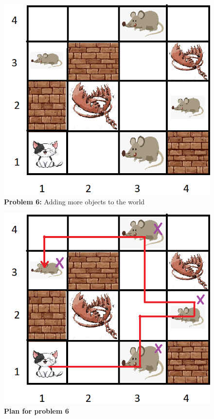 \begin{multicols}{2}

\begin{figure}[H]
    \centering
    \includegraphics[width=\linewidth]{fig/A3/cat_06.png}
    \caption{\textbf{Problem 6:} Adding more objects to the world}
    \label{fig:cat_06}
\end{figure}

\columnbreak

\begin{figure}[H]
    \centering
    \includegraphics[width=\linewidth]{fig/A3/cat_06_sol.png}
    \caption{\textbf{Plan for problem 6}}
    \label{fig:cat_06_sol}
\end{figure}

\end{multicols}

